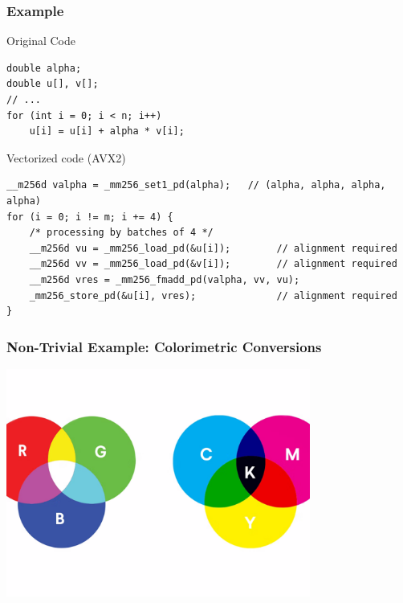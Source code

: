 \documentclass[xcolor={x11names,svgnames}]{beamer}
\begin{document}

\begin{frame}[fragile=singleslide]
  \frametitle{Example}

  \begin{block}{Original Code}
\begin{verbatim}
double alpha;
double u[], v[];
// ...
for (int i = 0; i < n; i++)
    u[i] = u[i] + alpha * v[i];
\end{verbatim}
\end{block}

\begin{exampleblock}{Vectorized code (AVX2)}
\begin{verbatim}
__m256d valpha = _mm256_set1_pd(alpha);   // (alpha, alpha, alpha, alpha)
for (i = 0; i != m; i += 4) {
    /* processing by batches of 4 */
    __m256d vu = _mm256_load_pd(&u[i]);        // alignment required
    __m256d vv = _mm256_load_pd(&v[i]);        // alignment required
    __m256d vres = _mm256_fmadd_pd(valpha, vv, vu);
    _mm256_store_pd(&u[i], vres);              // alignment required
}
  \end{verbatim}
\end{exampleblock}
\end{frame}


\begin{frame}[fragile=singleslide]
  \frametitle{Non-Trivial Example: Colorimetric Conversions}

  \centering
  \includegraphics[width=10cm]{rgb_cmyk.png}
\end{frame}

\end{document}
